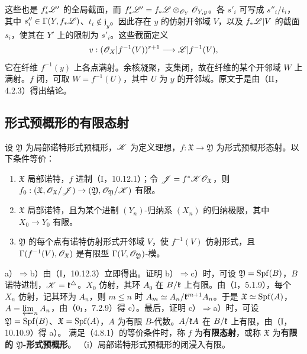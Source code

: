 这些也是 $f'_*\mathscr L'$ 的全局截面，而 $f'_*\mathscr L'=f_*\mathscr L\otimes_{\mathscr O_Y}\mathscr O_{Y,y}$。各 $s'_i$ 可写成 $s''_i/t_i$，其中 $s''_i\in\Gamma(Y,f_*\mathscr L)$、$t_i\notin\mathfrak j_y$。因此存在 $y$ 的仿射开邻域 $V$，以及 $f_*\mathscr L|V$ 的截面 $s_i$，使其在 $Y'$ 上的限制为 $s'_i$。这些截面定义
\[
v:(\mathscr O_X|f^{-1}(V))^{r+1}\longrightarrow\mathscr L|f^{-1}(V),
\]
它在纤维 $f^{-1}(y)$ 上各点满射。余核凝聚，支集闭，故在纤维的某个开邻域 $W$ 上满射。$f$ 闭，可取 $W=f^{-1}(U)$，其中 $U$ 为 $y$ 的开邻域。原文于是由（II，4.2.3）得出结论。\finishproof

\subsection{形式预概形的有限态射}
设 $\mathfrak Y$ 为局部诺特形式预概形，$\mathscr K$ 为定义理想，$f:\mathfrak X\to\mathfrak Y$ 为形式预概形态射。以下条件等价：
\begin{enumerate}[label=\alph*)]
\item $\mathfrak X$ 局部诺特，$f$ 进制（I，10.12.1）；令 $\mathscr J=f^*\mathscr K\mathscr O_{\mathfrak X}$，则 $f_0:(\mathfrak X,\mathscr O_{\mathfrak X}/\mathscr J)\to(\mathfrak Y,\mathscr O_{\mathfrak Y}/\mathscr K)$ 有限。
\item $\mathfrak X$ 局部诺特，且为某个进制 $(Y_n)$-归纳系 $(X_n)$ 的归纳极限，其中 $X_0\to Y_0$ 有限。
\item $\mathfrak Y$ 的每个点有诺特仿射形式开邻域 $V$，使 $f^{-1}(V)$ 仿射形式，且 $\Gamma(f^{-1}(V),\mathscr O_{\mathfrak X})$ 是有限型 $\Gamma(V,\mathscr O_{\mathfrak Y})$-模。
\end{enumerate}
\eproof
a）$\Rightarrow$b）由（I，10.12.3）立即得出。证明 b）$\Rightarrow$c）时，可设 $\mathfrak Y=\operatorname{Spf}(B)$，$B$ 诺特进制，$\mathscr K=\mathfrak k^\triangle$。$X_0$ 仿射，其环 $A_0$ 在 $B/\mathfrak k$ 上有限。由（I，5.1.9），每个 $X_n$ 仿射，记其环为 $A_n$，则 $m\le n$ 时 $A_m\simeq A_n/\mathfrak k^{m+1}A_n$。于是 $\mathfrak X\simeq\operatorname{Spf}(A)$，$A=\varprojlim_nA_n$，由（$0_{\mathrm I}$，7.2.9）得 c）。最后，证明 c）$\Rightarrow$a）时，可设 $\mathfrak Y=\operatorname{Spf}(B)$、$\mathfrak X=\operatorname{Spf}(A)$，$A$ 为有限 $B$-代数。$A/\mathfrak k A$ 在 $B/\mathfrak k$ 上有限，由（I，10.10.9）得 a）。\finishproof
{}
满足（4.8.1）的等价条件时，称 $f$ 为\textbf{有限态射}，或称 $\mathfrak X$ 为\textbf{有限的 $\mathfrak Y$-形式预概形}。
（i）局部诺特形式预概形的闭浸入有限。

